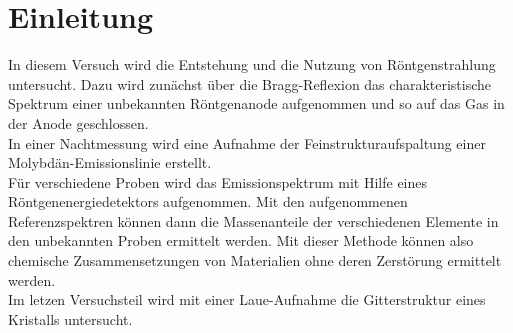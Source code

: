 \section{Einleitung}
In diesem Versuch wird die Entstehung und die Nutzung von Röntgenstrahlung untersucht. Dazu wird zunächst über die Bragg-Reflexion das charakteristische Spektrum einer unbekannten Röntgenanode aufgenommen und so auf das Gas in der Anode geschlossen. \\
In einer Nachtmessung wird eine Aufnahme der Feinstrukturaufspaltung einer Molybdän-Emissionslinie erstellt. \\
Für verschiedene Proben wird das Emissionspektrum mit Hilfe eines Röntgenenergiedetektors aufgenommen. Mit den aufgenommenen Referenzspektren können dann die Massenanteile der verschiedenen Elemente in den unbekannten Proben ermittelt werden. Mit dieser Methode können also chemische Zusammensetzungen von Materialien ohne deren Zerstörung ermittelt werden. \\
Im letzen Versuchsteil wird mit einer Laue-Aufnahme die Gitterstruktur eines Kristalls untersucht. 
